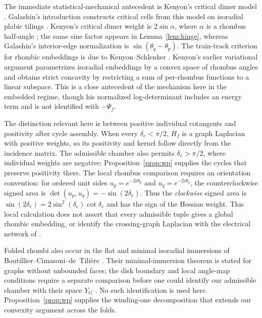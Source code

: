 \documentclass[11pt]{article}
\theoremstyle{definition}
\begin{document}
The immediate statistical-mechanical antecedent is Kenyon's critical dimer model
\cite{Kenyon}. Galashin's introduction constructs critical cells from this model on
isoradial plabic tilings \cite[Introduction and \S1.2]{Galashin}. Kenyon's critical
dimer weight is $2\sin\alpha$, where $\alpha$ is a rhombus half-angle
\cite[\S2.3]{Kenyon}; the same sine factor appears in Lemma~\ref{lem:hinge},
whereas Galashin's interior-edge normalization is $\sin(\theta_q-\theta_p)$.
The train-track criterion for rhombic embeddings is due to Kenyon--Schlenker
\cite[Thm.~3.1]{KenyonSchlenker}.
Kenyon's earlier variational argument \cite[\S8, Prop.~8.1 and Thm.~8.2]{Kenyon}
parametrizes isoradial embeddings by a convex space of rhombus angles and obtains
strict concavity by restricting a sum of per-rhombus functions to a linear
subspace. This is a close antecedent of the mechanism here in the embedded
regime, though his normalized log-determinant includes an energy term and is
not identified with $-\Psi_f$.

The distinction relevant here is between positive individual cotangents and positivity
after cycle assembly. When every $\delta_e<\pi/2$, $H_f$ is a graph Laplacian with
positive weights, so its positivity and kernel follow directly from the incidence
matrix. The admissible chamber also permits $\delta_e>\pi/2$, where individual
weights are negative; Proposition~\ref{prop:wp} supplies the cycles that preserve
positivity there. The local rhombus comparison requires an orientation convention:
for ordered unit sides $u_p=e^{-2i\theta_p}$ and $u_q=e^{-2i\theta_q}$, the
counterclockwise signed area is
$\det(u_p,u_q)=-\sin(2\delta_e)$. Thus the \emph{clockwise} signed area is
$\sin(2\delta_e)=2\sin^2(\delta_e)\cot\delta_e$ and has the sign of the Hessian
weight. This local calculation does not assert that every admissible tuple gives
a global rhombic embedding, or identify the crossing-graph Laplacian with the
electrical network of \cite[\S1.6]{Galashin}.

Folded rhombi also occur in the flat and minimal isoradial immersions of
Boutillier--Cimasoni--de~Tili\`ere
\cite[Thms.~15 and~23; \S3.4]{BoutillierCimasoniDeTiliere}.
Their minimal-immersion theorem is stated for graphs without unbounded faces;
the disk boundary and local angle-map conditions require a separate comparison
before one could identify our admissible chamber with their space $Y_G$
\cite[\S4 and Lem.~26]{BoutillierCimasoniDeTiliere}. No such identification is
used here. Proposition~\ref{prop:wp} supplies the winding-one decomposition
that extends our convexity argument across the folds.
\end{document}

